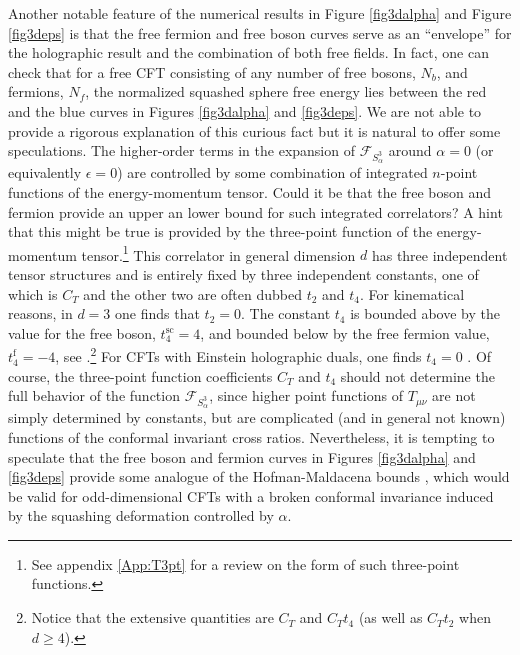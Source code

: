 \documentclass[12pt]{article}
\numberwithin{equation}{section}
\newcommand{\ssc}{\scriptscriptstyle}
\newcommand{\ctt}{C_{\ssc T}}
\begin{document}
Another notable feature of the numerical results in Figure \ref{fig3dalpha} and Figure \ref{fig3deps} is that the free fermion and free boson curves serve as an ``envelope'' for the holographic result and the combination of both free fields. In fact, one can check that for a free CFT consisting of any number of free bosons, $N_b$, and fermions, $ N_f$, the normalized squashed sphere free energy lies between the red and the blue curves in Figures \ref{fig3dalpha} and \ref{fig3deps}. We are not able to provide a rigorous explanation of this curious fact but it is natural to offer some speculations. The higher-order terms in the expansion of $\mathcal{F}_{S^3_{\alpha}}$ around $\alpha=0$ (or equivalently $\epsilon=0$) are controlled by some combination of integrated $n$-point functions of the energy-momentum tensor. Could it be that the free boson and fermion provide an upper an lower bound for such integrated correlators? A hint that this might be true is provided by the three-point function of the energy-momentum tensor.\footnote{See appendix \ref{App:T3pt} for a review on the form of such three-point functions.} This correlator in general dimension $d$ has three independent tensor structures and is entirely fixed by three independent constants, one of which is $\ctt$ and the other two are often dubbed $t_2$ and $t_4$. For kinematical reasons, in $d=3$ one finds that $t_2=0$. The constant $t_4$ is bounded above by the value for the free boson, $t_4^{\textrm{sc}}=4$, and bounded below by the free fermion value, $t_4^{\textrm{f}}=-4$, see \cite{Osborn,Erdmenger:1996yc,Hofman:2008ar,Buchel:2009sk}.\footnote{Notice that the extensive quantities are $\ctt$ and $\ctt t_4$ (as well as  $\ctt t_2$ when $d\geq4$).} For CFTs with Einstein holographic duals, one finds $t_4=0$ \cite{Hofman:2008ar,Buchel:2009sk}. Of course, the three-point function coefficients $\ctt$ and $t_4$ should not determine the full behavior of the function $\mathcal{F}_{S^3_{\alpha}}$, since higher point functions of $T_{\mu\nu}$ are not simply determined by constants, but are complicated (and in general not known) functions of the conformal invariant cross ratios. Nevertheless, it is tempting to speculate that the free boson and fermion curves in Figures \ref{fig3dalpha} and \ref{fig3deps} provide some analogue of the Hofman-Maldacena bounds \cite{Hofman:2008ar,Buchel:2009sk}, which would be valid for odd-dimensional CFTs with a broken conformal invariance induced by the squashing deformation controlled by $\alpha$.  
\end{document}

